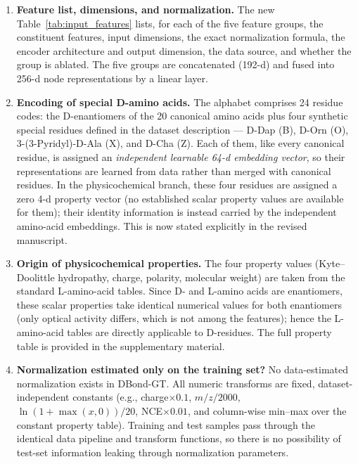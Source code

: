 \begin{enumerate}
    \item \textbf{Feature list, dimensions, and normalization.} The new
    Table~\ref{tab:input_features} lists, for each of the five feature
    groups, the constituent features, input dimensions, the exact
    normalization formula, the encoder architecture and output dimension,
    the data source, and whether the group is ablated. The five groups are
    concatenated (192-d) and fused into 256-d node representations by a
    linear layer.

    \item \textbf{Encoding of special D-amino acids.} The alphabet comprises
    24 residue codes: the D-enantiomers of the 20 canonical amino acids plus
    four synthetic special residues defined in the dataset description ---
    D-Dap (B), D-Orn (O), 3-(3-Pyridyl)-D-Ala (X), and D-Cha (Z). Each of
    them, like every canonical residue, is assigned an \emph{independent
    learnable 64-d embedding vector}, so their representations are learned
    from data rather than merged with canonical residues. In the
    physicochemical branch, these four residues are assigned a zero 4-d
    property vector (no established scalar property values are available for
    them); their identity information is instead carried by the independent
    amino-acid embeddings. This is now stated explicitly in the revised
    manuscript.

    \item \textbf{Origin of physicochemical properties.} The four property
    values (Kyte--Doolittle hydropathy, charge, polarity, molecular weight)
    are taken from the standard L-amino-acid tables. Since D- and
    L-amino acids are enantiomers, these scalar properties take identical
    numerical values for both enantiomers (only optical activity differs,
    which is not among the features); hence the L-amino-acid tables are
    directly applicable to D-residues. The full property table is provided
    in the supplementary material.

    \item \textbf{Normalization estimated only on the training set?} No
    data-estimated normalization exists in DBond-GT. All numeric transforms
    are fixed, dataset-independent constants (e.g., charge$\times0.1$,
    $m/z / 2000$, $\ln(1+\max(x,0))/20$, NCE$\times0.01$, and column-wise
    min--max over the constant property table). Training and test samples
    pass through the identical data pipeline and transform functions, so
    there is no possibility of test-set information leaking through
    normalization parameters.


\end{enumerate}
